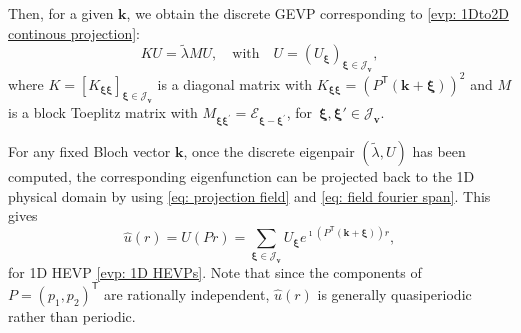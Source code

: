 \documentclass[11pt]{article}
\def\k{\mathbf{k}}
\def\v{\mathbf{v}}
\numberwithin{equation}{section}
\begin{document}
Then, for a given $\k$, we obtain the discrete GEVP corresponding to \eqref{evp: 1Dto2D continous projection}:
\begin{equation} \label{df: Spectral Method 2D}
K U= \widetilde{\lambda} M U,  \quad \text{with} \quad U = \left(U_{\boldsymbol{\xi}}\right)_{\boldsymbol{\xi} \in \mathcal{J}_\v},
\end{equation}
where $K = \left[ K_{\boldsymbol{\xi}\boldsymbol{\xi}} \right]_{\boldsymbol{\xi} \in \mathcal{J}_\v} $ is a diagonal matrix with $K_{\boldsymbol{\xi}\boldsymbol{\xi}} = \left( P^\mathsf{T} (\mathbf{k} + \boldsymbol{\xi}) \right)^2$  and $M$ is a block Toeplitz matrix with $ M_{\boldsymbol{\xi}\boldsymbol{\xi}^\prime} = \mathcal{E}_{\boldsymbol{\xi} - \boldsymbol{\xi}^\prime}$, for $\, \boldsymbol{\xi}, \boldsymbol{\xi}\prime \in \mathcal{J}_\v.$

For any  fixed Bloch vector $\mathbf{k}$, once the discrete eigenpair $(\widetilde{\lambda},U)$ has been computed, the corresponding eigenfunction can be projected back to the 1D physical domain by using \eqref{eq: projection field} and \eqref{eq: field fourier span}. This gives
\begin{equation} \label{sol: spectral projection}
\widehat{u}(r)
= U(P r)
= \sum_{\boldsymbol{\xi} \in \mathcal{J}_\v}
U_{\boldsymbol{\xi}} e^{\imath \left(P^\mathsf{T}(\mathbf{k} + \boldsymbol{\xi})\right) r},
\end{equation}
for 1D HEVP \eqref{evp: 1D HEVPs}.  Note that since the components of $P=(p_1,p_2)^{\mathsf{T}}$ are rationally independent, $\widehat{u}(r)$ is generally quasiperiodic rather than periodic.
\end{document}
